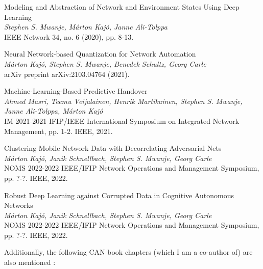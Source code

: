 			\begin{publication}
				Modeling and Abstraction of Network and Environment States Using Deep Learning \\
				\textit{Stephen S. Mwanje, Márton Kajó, Janne Ali-Tolppa} \\
				IEEE Network 34, no. 6 (2020), pp. 8-13.
			\end{publication}
					
			\begin{publication}
				Neural Network-based Quantization for Network Automation \\
				\textit{Márton Kajó, Stephen S. Mwanje, Benedek Schultz, Georg Carle} \\
				arXiv preprint arXiv:2103.04764 (2021).
			\end{publication}
			
			\begin{publication}
				Machine-Learning-Based Predictive Handover \\
				\textit{Ahmed Masri, Teemu Veijalainen, Henrik Martikainen, Stephen S. Mwanje, Janne Ali-Tolppa, Márton Kajó} \\
				IM 2021-2021 IFIP/IEEE International Symposium on Integrated Network Management, pp. 1-2. IEEE, 2021.
			\end{publication}
			
			\begin{publication}
				Clustering Mobile Network Data with Decorrelating Adversarial Nets \\
				\textit{Márton Kajó, Janik Schnellbach, Stephen S. Mwanje, Georg Carle} \\
				NOMS 2022-2022 IEEE/IFIP Network Operations and Management Symposium, pp. ?-?. IEEE, 2022.
			\end{publication}
		
			\begin{publication}
				Robust Deep Learning against Corrupted Data in Cognitive Autonomous Networks \\
				\textit{Márton Kajó, Janik Schnellbach, Stephen S. Mwanje, Georg Carle} \\
				NOMS 2022-2022 IEEE/IFIP Network Operations and Management Symposium, pp. ?-?. IEEE, 2022.
			\end{publication}
			
			Additionally, the following \ac{CAN} book chapters (which I am a co-author of) are also mentioned \cite{can_book}:
			

